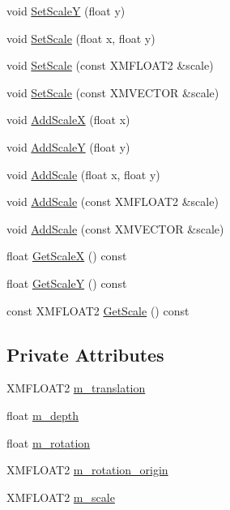 \begin{DoxyCompactItemize}
\item 
void \hyperlink{structmage_1_1_sprite_transform_a321067fab6d62931e17f1604ce50709d}{Set\+ScaleY} (float y)
\item 
void \hyperlink{structmage_1_1_sprite_transform_abc9fdab6e961508423befabd0648dab6}{Set\+Scale} (float x, float y)
\item 
void \hyperlink{structmage_1_1_sprite_transform_a24008167674c9fb524c48214e6893c1d}{Set\+Scale} (const X\+M\+F\+L\+O\+A\+T2 \&scale)
\item 
void \hyperlink{structmage_1_1_sprite_transform_ae2d2f99ca3d3d04c1525c99538331c1a}{Set\+Scale} (const X\+M\+V\+E\+C\+T\+OR \&scale)
\item 
void \hyperlink{structmage_1_1_sprite_transform_aff82cf6bde45535de538fe93cf99d4c5}{Add\+ScaleX} (float x)
\item 
void \hyperlink{structmage_1_1_sprite_transform_a8cc05bfa72d615c99fc5c3cfcef8e096}{Add\+ScaleY} (float y)
\item 
void \hyperlink{structmage_1_1_sprite_transform_a4e260b9085f2609523979a7a0446c748}{Add\+Scale} (float x, float y)
\item 
void \hyperlink{structmage_1_1_sprite_transform_a2310f5a1d31bc6a42b5f1e6e0490f5f6}{Add\+Scale} (const X\+M\+F\+L\+O\+A\+T2 \&scale)
\item 
void \hyperlink{structmage_1_1_sprite_transform_a6fd99c8fb7d578f17099624aef6bcdef}{Add\+Scale} (const X\+M\+V\+E\+C\+T\+OR \&scale)
\item 
float \hyperlink{structmage_1_1_sprite_transform_ae192203af55097b4e296ce0cb916cd97}{Get\+ScaleX} () const
\item 
float \hyperlink{structmage_1_1_sprite_transform_ad25f6881510e258a5afb00ae9ad7bc87}{Get\+ScaleY} () const
\item 
const X\+M\+F\+L\+O\+A\+T2 \hyperlink{structmage_1_1_sprite_transform_a65674382a140225b7a18b5a26bde23bd}{Get\+Scale} () const
\end{DoxyCompactItemize}
\subsection*{Private Attributes}
\begin{DoxyCompactItemize}
\item 
X\+M\+F\+L\+O\+A\+T2 \hyperlink{structmage_1_1_sprite_transform_a7642907ec8ae9685bb7c56675607045b}{m\+\_\+translation}
\item 
float \hyperlink{structmage_1_1_sprite_transform_a9a61159b9f52e5cc18c0f8cea378714c}{m\+\_\+depth}
\item 
float \hyperlink{structmage_1_1_sprite_transform_a6fcb43d224953ea5f38ef54c4e10e003}{m\+\_\+rotation}
\item 
X\+M\+F\+L\+O\+A\+T2 \hyperlink{structmage_1_1_sprite_transform_ae51ebd0226ef4b569b6a66884823bd18}{m\+\_\+rotation\+\_\+origin}
\item 
X\+M\+F\+L\+O\+A\+T2 \hyperlink{structmage_1_1_sprite_transform_a7532d4d41d02b5fa6f31eeb4fd4fd886}{m\+\_\+scale}
\end{DoxyCompactItemize}


